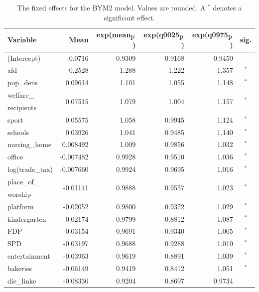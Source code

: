 \begin{table}[H] 
\caption{The fixed effects for the BYM2 model. Values are rounded. A $^*$ denotes a significant effect.\label{fixedAllGermany}}
\begin{tabular}{l r r r r c}
\toprule
\textbf{Variable}	& \textbf{Mean}	& \textbf{exp(mean$_{\hbox{p}}$)} & \textbf{exp(q0025$_{\hbox{p}}$)} & \textbf{exp(q0975$_{\hbox{p}}$)} & \textbf{sig.}\\
\midrule
(Intercept) & -0.0716 & 0.9309 & 0.9168 & 0.9450 &\\
afd & 0.2528 & 1.288 & 1.222 & 1.357 &$^*$\\
pop\_dens & 0.09614 & 1.101 & 1.055 & 1.148 &$^*$\\
welfare\_ & \multirow{2}{*}{0.07515} & \multirow{2}{*}{1.079} & \multirow{2}{*}{1.004} & \multirow{2}{*}{1.157}&\multirow{2}{*}{$^*$} \\
recipients\\
sport & 0.05575 & 1.058 & 0.9945 & 1.124 &$^*$\\
schools & 0.03926 & 1.041 & 0.9485 & 1.140 &$^*$\\
nursing\_home & 0.008492 & 1.009 & 0.9856 & 1.032&$^*$ \\
office & -0.007482 & 0.9928 & 0.9510 & 1.036 &$^*$\\
log(trade\_tax) & -0.007660 & 0.9924 & 0.9695 & 1.016&$^*$ \\
place\_of\_ & \multirow{2}{*}{-0.01141} & \multirow{2}{*}{0.9888} & \multirow{2}{*}{0.9557} & \multirow{2}{*}{1.023} &\multirow{2}{*}{$^*$}\\
worship\\
platform & -0.02052 & 0.9800 & 0.9322 & 1.029 &$^*$\\
kindergarten & -0.02174 &  0.9799 & 0.8812 & 1.087 &$^*$\\
FDP & -0.03154 & 0.9691 & 0.9340 & 1.005 &$^*$\\
SPD & -0.03197 & 0.9688 & 0.9288 & 1.010 &$^*$\\
entertainment & -0.03963 & 0.9619 & 0.8891 & 1.039 &$^*$\\
bakeries & -0.06149 & 0.9419 & 0.8412 & 1.051 &$^*$\\
die\_linke & -0.08336 &  0.9204 & 0.8697 & 0.9734\\
\bottomrule
\end{tabular}
\end{table}
